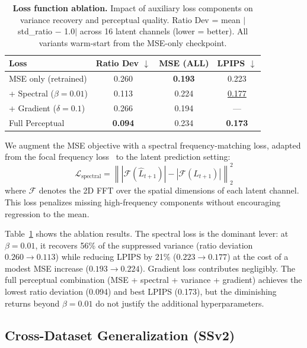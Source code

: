 \documentclass{article}
\begin{document}
\begin{table}[t]
\centering
\caption{%
  \textbf{Loss function ablation.} Impact of auxiliary loss components
  on variance recovery and perceptual quality.
  Ratio Dev = mean $|$std\_ratio $-$ 1.0$|$ across 16 latent channels
  (lower = better).
  All variants warm-start from the MSE-only checkpoint.
}
\label{tab:loss_ablation}
\begin{tabular}{@{}lccc@{}}
\toprule
Loss & Ratio Dev $\downarrow$ & MSE (ALL) & LPIPS $\downarrow$ \\
\midrule
MSE only (retrained)
  & 0.260
  & \textbf{0.193}
  & 0.223 \\
+ Spectral ($\beta{=}0.01$)
  & 0.113
  & 0.224
  & \underline{0.177} \\
+ Gradient ($\delta{=}0.1$)
  & 0.266
  & 0.194
  & --- \\
Full Perceptual
  & \textbf{0.094}
  & 0.234
  & \textbf{0.173} \\
\bottomrule
\end{tabular}
\end{table}

We augment the MSE objective with a spectral frequency-matching loss,
adapted from the focal frequency loss~\cite{jiang2021focal} to the
latent prediction setting:
\begin{equation}
\mathcal{L}_\text{spectral} = \left\|
  |\mathcal{F}(\hat{L}_{t+1})| - |\mathcal{F}(L_{t+1})|
\right\|_2^2
\label{eq:spectral}
\end{equation}
where $\mathcal{F}$ denotes the 2D FFT over the spatial dimensions of
each latent channel.
This loss penalizes missing high-frequency components without
encouraging regression to the mean.

Table~\ref{tab:loss_ablation} shows the ablation results.
The spectral loss is the dominant lever: at $\beta{=}0.01$, it recovers
56\% of the suppressed variance (ratio deviation $0.260 \to 0.113$)
while reducing LPIPS by 21\% ($0.223 \to 0.177$) at the cost of a
modest MSE increase ($0.193 \to 0.224$).
Gradient loss contributes negligibly.
The full perceptual combination (MSE + spectral + variance + gradient)
achieves the lowest ratio deviation (0.094) and best LPIPS (0.173), but
the diminishing returns beyond $\beta{=}0.01$ do not justify the
additional hyperparameters.

\subsection{Cross-Dataset Generalization (SSv2)}
\label{sec:ssv2}
\end{document}
